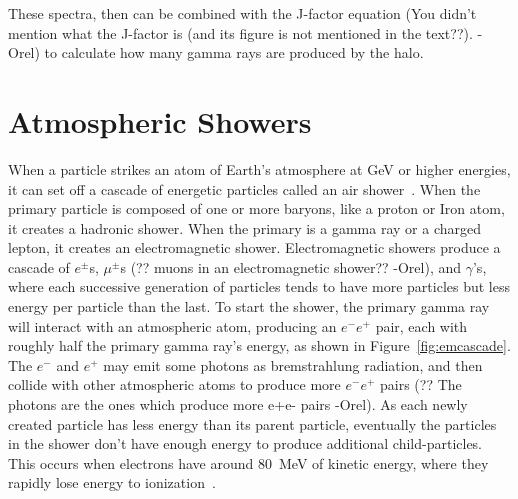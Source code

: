     These spectra, then can be combined with the {\color{red}J-factor equation (You didn’t mention what the J-factor is (and its figure is not mentioned in the text??). -Orel)} to calculate how many gamma rays are produced by the halo.

    \FloatBarrier
    
    
\section{Atmospheric Showers}

  When a particle strikes an atom of Earth's atmosphere at GeV or higher energies, it can set off a cascade of energetic particles called an air shower~\cite{Bethe1934,Klein1999}.
  When the primary particle is composed of one or more baryons, like a proton or Iron atom, it creates a hadronic shower.
  When the primary is a gamma ray or a charged lepton, it creates an electromagnetic shower.
  Electromagnetic showers produce a cascade of $e^{\pm}$s, $\mu^{\pm}$s {\color{red}(?? muons in an electromagnetic shower?? -Orel)}, and $\gamma$'s, where each successive generation of particles tends to have more particles but less energy per particle than the last.
  To start the shower, the primary gamma ray will interact with an atmospheric atom, producing an $e^{-}e^{+}$ pair, each with roughly half the primary gamma ray's energy, as shown in Figure~\ref{fig:emcascade}.
  The $e^{-}$ and $e^{+}$ may emit some photons as bremstrahlung radiation, and then {\color{red}collide with other atmospheric atoms to produce more $e^{-}e^{+}$ pairs (?? The photons are the ones which produce more e+e- pairs -Orel)}.
  As each newly created particle has less energy than its parent particle, eventually the particles in the shower don't have enough energy to produce additional child-particles.
  This occurs when electrons have around \SI{80}{MeV} of kinetic energy, where they rapidly lose energy to ionization~\cite{pdg_2014}.


